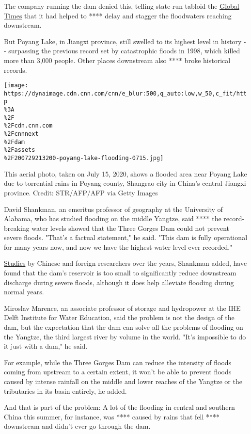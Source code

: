 The company running the dam denied this, telling state-run tabloid the
\href{https://www.globaltimes.cn/content/1195133.shtml}{Global Times}
that it had helped to **** delay and stagger the floodwaters reaching
downstream.

But Poyang Lake, in Jiangxi province, still swelled to its highest level
in history -\/- surpassing the previous record set by catastrophic
floods in 1998, which killed more than 3,000 people. Other places
downstream also **** broke historical records.

\texttt{[image: https://dynaimage.cdn.cnn.com/cnn/e\_blur:500,q\_auto:low,w\_50,c\_fit/http\\\%3A\\\%2F\\\%2Fcdn.cnn.com\\\%2Fcnnnext\\\%2Fdam\\\%2Fassets\\\%2F200729213200-poyang-lake-flooding-0715.jpg]}

This aerial photo, taken on July 15, 2020, shows a flooded area near
Poyang Lake due to torrential rains in Poyang county, Shangrao city in
China's central Jiangxi province. Credit: STR/AFP/AFP via Getty Images

David Shankman, an emeritus professor of geography at the University of
Alabama, who has studied flooding on the middle Yangtze, said **** the
record-breaking water levels showed that the Three Gorges Dam could not
prevent severe floods. "That's a factual statement," he said. "This dam
is fully operational for many years now, and now we have the highest
water level ever recorded."

\href{http://www.cqvip.com/main/export.aspx?id=3307389\&type=1\&sign=a331b60d8503af649735ace4b2bfd1b7}{Studies}
by Chinese and foreign researchers over the years, Shankman added, have
found that the dam's reservoir is too small to significantly reduce
downstream discharge during severe floods, although it does help
alleviate flooding during normal years.

Miroslav Marence, an associate professor of storage and hydropower at
the IHE Delft Institute for Water Education, said the problem is not the
design of the dam, but the expectation that the dam can solve all the
problems of flooding on the Yangtze, the third largest river by volume
in the world. "It's impossible to do it just with a dam," he said.

For example, while the Three Gorges Dam can reduce the intensity of
floods coming from upstream to a certain extent, it won't be able to
prevent floods caused by intense rainfall on the middle and lower
reaches of the Yangtze or the tributaries in its basin entirely, he
added.

And that is part of the problem: A lot of the flooding in central and
southern China this summer, for instance, was **** caused by rains that
fell **** downstream and didn't ever go through the dam.

